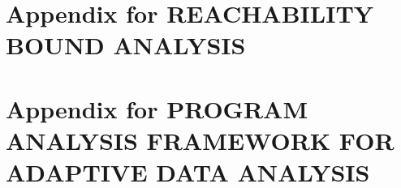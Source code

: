 \documentclass[12pt, letterpaper]{report}   %
\begin{document}
\chapter*{}
\appendix
\begingroup
  \hypersetup{linkbordercolor=white,linkcolor=black,
    filecolor=black, urlcolor=black} 
\listofappendixfigures
\endgroup
%
\chapter{Appendix for REACHABILITY BOUND ANALYSIS}
\label{apdx:reachability}


\chapter{Appendix for PROGRAM ANALYSIS FRAMEWORK FOR ADAPTIVE DATA ANALYSIS}
\label{apdx:adapt}





% 
\end{document}

